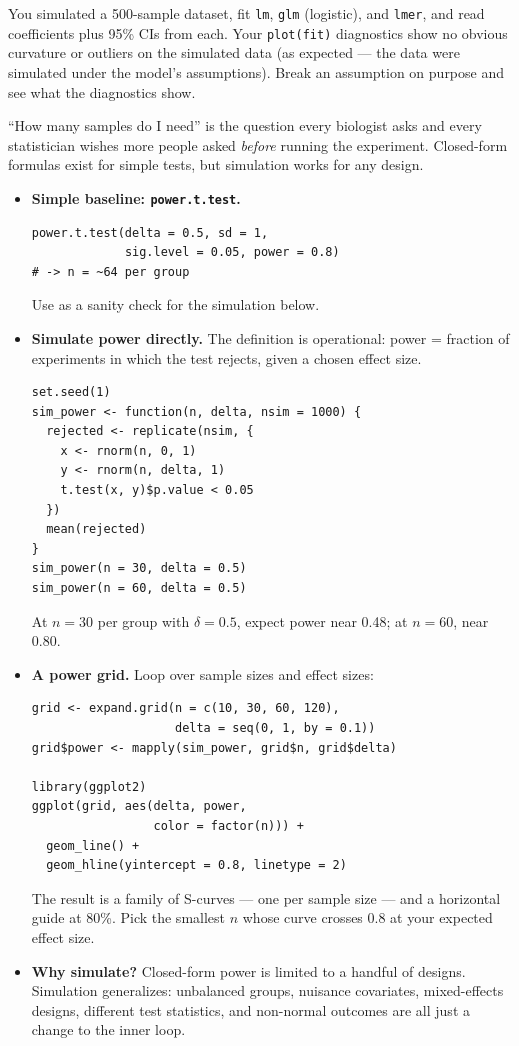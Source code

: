 \begin{winbox}[Checkpoint]
You simulated a 500-sample dataset, fit \texttt{lm}, \texttt{glm} (logistic), and \texttt{lmer}, and read coefficients plus 95\% CIs from each. Your \texttt{plot(fit)} diagnostics show no obvious curvature or outliers on the simulated data (as expected --- the data were simulated under the model's assumptions). Break an assumption on purpose and see what the diagnostics show.
\end{winbox}

``How many samples do I need'' is the question every biologist asks and every statistician wishes more people asked \textit{before} running the experiment. Closed-form formulas exist for simple tests, but simulation works for any design.
\begin{itemize}[nosep]
  \item \textbf{Simple baseline: \texttt{power.t.test}.}
    \begin{lstlisting}
power.t.test(delta = 0.5, sd = 1,
             sig.level = 0.05, power = 0.8)
# -> n = ~64 per group
    \end{lstlisting}
    Use as a sanity check for the simulation below.
  \item \textbf{Simulate power directly.} The definition is operational: power = fraction of experiments in which the test rejects, given a chosen effect size.
    \begin{lstlisting}
set.seed(1)
sim_power <- function(n, delta, nsim = 1000) {
  rejected <- replicate(nsim, {
    x <- rnorm(n, 0, 1)
    y <- rnorm(n, delta, 1)
    t.test(x, y)$p.value < 0.05
  })
  mean(rejected)
}
sim_power(n = 30, delta = 0.5)
sim_power(n = 60, delta = 0.5)
    \end{lstlisting}
    At $n = 30$ per group with $\delta = 0.5$, expect power near 0.48; at $n = 60$, near 0.80.
  \item \textbf{A power grid.} Loop over sample sizes and effect sizes:
    \begin{lstlisting}
grid <- expand.grid(n = c(10, 30, 60, 120),
                    delta = seq(0, 1, by = 0.1))
grid$power <- mapply(sim_power, grid$n, grid$delta)

library(ggplot2)
ggplot(grid, aes(delta, power,
                 color = factor(n))) +
  geom_line() +
  geom_hline(yintercept = 0.8, linetype = 2)
    \end{lstlisting}
    The result is a family of S-curves --- one per sample size --- and a horizontal guide at 80\%. Pick the smallest $n$ whose curve crosses 0.8 at your expected effect size.
  \item \textbf{Why simulate?} Closed-form power is limited to a handful of designs. Simulation generalizes: unbalanced groups, nuisance covariates, mixed-effects designs, different test statistics, and non-normal outcomes are all just a change to the inner loop.
\end{itemize}
